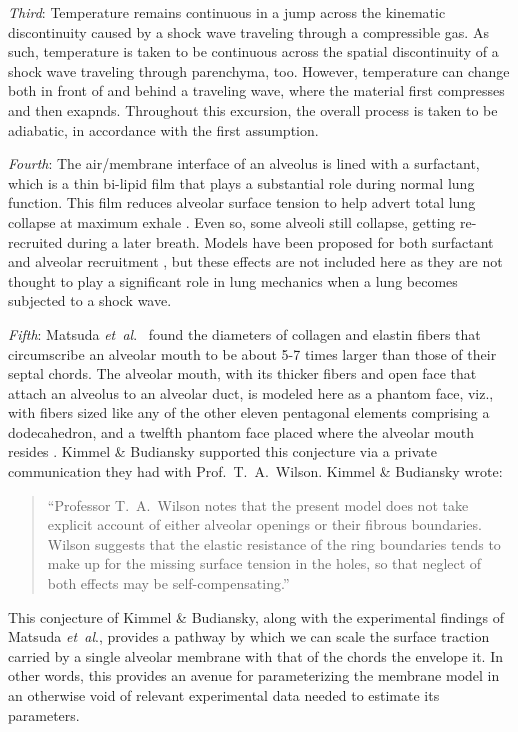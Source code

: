\textit{Third\/}: Temperature remains continuous in a jump across the kinematic discontinuity caused by a shock wave traveling through a compressible gas. \cite{AmesStaff53} As such, temperature is taken to be continuous across the spatial discontinuity of a shock wave traveling through parenchyma, too.  However, temperature can change both in front of and behind a traveling wave, where the material first compresses and then exapnds.  Throughout this excursion, the overall process is taken to be adiabatic, in accordance with the first assumption.

\textit{Fourth\/}: The air\slash membrane interface of an alveolus is lined with a surfactant, which is a thin bi-lipid film that plays a substantial role during normal lung function.  This film reduces alveolar surface tension to help advert total lung collapse at maximum exhale \cite{Stamenovic90}.  Even so, some alveoli still collapse, getting re-recruited during a later breath.  Models have been proposed for both surfactant \cite{Hills99} and alveolar recruitment \cite{Bates07}, but these effects are not included here as they are not thought to play a significant role in lung mechanics when a lung becomes subjected to a shock wave. 

\textit{Fifth\/}: Matsuda \textit{et~al}.\ \cite{Matsudaetal87} found the diameters of collagen and elastin fibers that circumscribe an alveolar mouth to be about 5-7 times larger than those of their septal chords.  The alveolar mouth, with its thicker fibers and open face that attach an alveolus to an alveolar duct, is modeled here as a phantom face, viz., with fibers sized like any of the other eleven pentagonal elements comprising a dodecahedron, and a twelfth phantom face placed where the alveolar mouth resides \cite{Freedetal12}.  Kimmel \& Budiansky supported this conjecture via a private communication they had with Prof.\ T.\ A.\ Wilson.  Kimmel \& Budiansky wrote: \cite{KimmelBudiansky90}
\small
\begin{quote}
    ``Professor T.\ A.\ Wilson notes that the present model does not take explicit account of either alveolar openings or their fibrous boundaries.  Wilson suggests that the elastic resistance of the ring boundaries tends to make up for the missing surface tension in the holes, so that neglect of both effects may be self-compensating.''
\end{quote}
\normalsize
This conjecture of Kimmel \& Budiansky, along with the experimental findings of Matsuda \textit{et~al}., provides a pathway by which we can scale the surface traction carried by a single alveolar membrane with that of the chords the envelope it.  In other words, this provides an avenue for parameterizing the membrane model in an other\-wise void of relevant experimental data needed to estimate its parameters.

